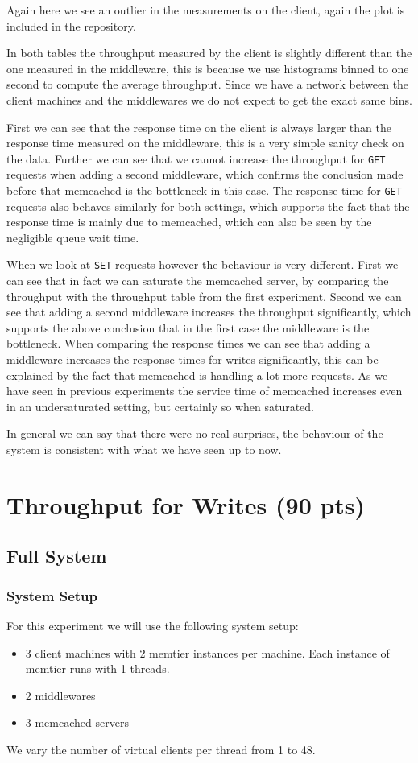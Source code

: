 \documentclass[11pt,a4paper]{article}
\begin{document}
%
Again here we see an outlier in the measurements on the client, again the plot is included in the repository.
%
\par
%
In both tables the throughput measured by the client is slightly different than the one measured in the middleware, this is because we use histograms binned to one second to compute the average throughput.
%
Since we have a network between the client machines and the middlewares we do not expect to get the exact same bins.
%
\par
%
First we can see that the response time on the client is always larger than the response time measured on the middleware, this is a very simple sanity check on the data.
%
Further we can see that we cannot increase the throughput for \texttt{GET} requests when adding a second middleware, which confirms the conclusion made before that memcached is the bottleneck in this case.
%
The response time for \texttt{GET} requests also behaves similarly for both settings, which supports the fact that the response time is mainly due to memcached, which can also be seen by the negligible queue wait time.
%
\par
%
When we look at \texttt{SET} requests however the behaviour is very different.
%
First we can see that in fact we can saturate the memcached server, by comparing the throughput with the throughput table from the first experiment.
%
Second we can see that adding a second middleware increases the throughput significantly, which supports the above conclusion that in the first case the middleware is the bottleneck.
%
When comparing the response times we can see that adding a middleware increases the response times for writes significantly, this can be explained by the fact that memcached is handling a lot more requests.
%
As we have seen in previous experiments the service time of memcached increases even in an undersaturated setting, but certainly so when saturated.
%
\par
%
In general we can say that there were no real surprises, the behaviour of the system is consistent with what we have seen up to now.
%
\section{Throughput for Writes (90 pts)}\label{sec:tp_write}
%
\subsection{Full System}
%
\subsubsection{System Setup}
%
For this experiment we will use the following system setup:
%
\begin{itemize}
	\item 3 client machines with 2 memtier instances per machine. Each instance of memtier runs with 1 threads.
	\item 2 middlewares
	\item 3 memcached servers
\end{itemize}
%
We vary the number of virtual clients per thread from 1 to 48.
%
\end{document}
